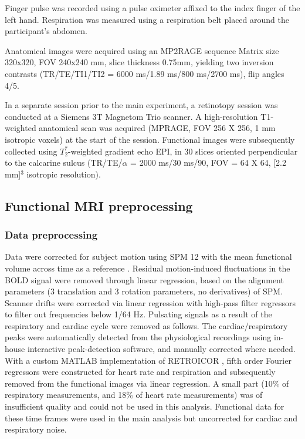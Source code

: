 \documentclass[9pt,lineno]{aperture}
\begin{document}
Finger pulse was recorded using a pulse oximeter affixed to the index finger of the left hand. Respiration was measured using a respiration belt placed around the participant's abdomen.

Anatomical images were acquired using an MP2RAGE sequence \citep{Marques2010} Matrix size 320x320, FOV 240x240 mm, slice thickness 0.75mm, yielding two inversion contrasts (TR/TE/TI1/TI2 = 6000 ms/1.89 ms/800 ms/2700 ms), flip angles 4/5\textdegree. 

In a separate session prior to the main experiment, a retinotopy session was conducted at a Siemens 3T Magnetom Trio scanner. A high-resolution T1-weighted anatomical scan was acquired (MPRAGE, FOV 256 X 256, 1 mm isotropic voxels) at the start of the session. Functional images were subsequently collected using $T_2^*$-weighted gradient echo EPI, in 30 slices oriented perpendicular to the calcarine sulcus (TR/TE/$\alpha$ = 2000 ms/30 ms/90\textdegree, FOV = 64 X 64, [2.2 mm]$^3$ isotropic resolution).

\subsection{Functional MRI preprocessing}
\subsubsection{Data preprocessing}
Data were corrected for subject motion using SPM 12 with the mean functional volume across time as a reference \citep{Friston1995}. Residual motion-induced fluctuations in the BOLD signal were removed through linear regression, based on the alignment parameters (3 translation and 3 rotation parameters, no derivatives) of SPM. Scanner drifts were corrected via linear regression with high-pass filter regressors to filter out frequencies below 1/64 Hz. Pulsating signals as a result of the respiratory and cardiac cycle were removed as follows. The cardiac/respiratory peaks were automatically detected from the physiological recordings using in-house interactive peak-detection software, and manually corrected where needed. With a custom MATLAB implementation of RETROICOR \citep{Glover2000}, fifth order Fourier regressors were constructed for heart rate and respiration and subsequently removed from the functional images via linear regression. A small part (10\% of respiratory measurements, and 18\% of heart rate measurements) was of insufficient quality and could not be used in this analysis. Functional data for these time frames were used in the main analysis but uncorrected for cardiac and respiratory noise.
\end{document}
